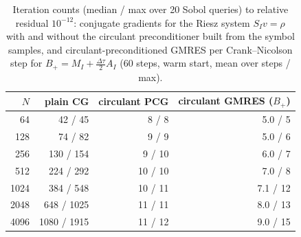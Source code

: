 \begin{table}[!htbp]
\centering\small
\caption{Iteration counts (median / max over 20 Sobol queries) to relative residual $10^{-12}$: conjugate gradients for the Riesz system $S_Iv=\rho$ with and without the circulant preconditioner built from the symbol samples, and circulant-preconditioned GMRES per Crank--Nicolson step for $B_+=M_I+\tfrac{\Delta\tau}{2}A_I$ (60 steps, warm start, mean over steps / max).}
\label{tab:pcg-v9}
\begin{tabular}{rrrr}
\toprule
$N$ & plain CG & circulant PCG & circulant GMRES ($B_+$)\\
\midrule
64 & 42 / 45 & 8 / 8 & 5.0 / 5\\
128 & 74 / 82 & 9 / 9 & 5.0 / 6\\
256 & 130 / 154 & 9 / 10 & 6.0 / 7\\
512 & 224 / 292 & 10 / 10 & 7.0 / 8\\
1024 & 384 / 548 & 10 / 11 & 7.1 / 12\\
2048 & 648 / 1025 & 11 / 11 & 8.0 / 13\\
4096 & 1080 / 1915 & 11 / 12 & 9.0 / 15\\
\bottomrule
\end{tabular}
\end{table}
